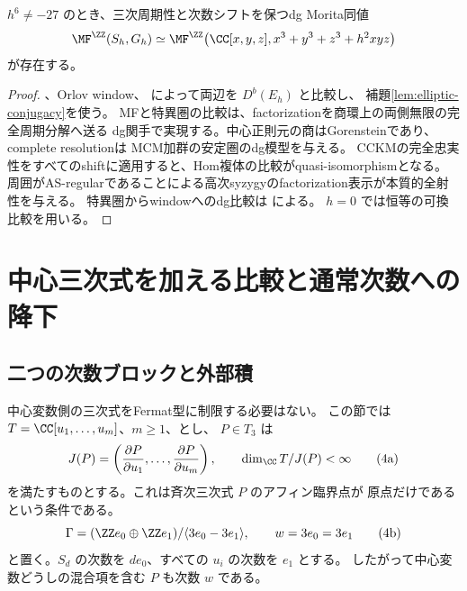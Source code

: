 \begin{corollary}\label{cor:block}
 \(h^6\ne-27\) のとき、三次周期性と次数シフトを保つdg Morita同値
 \[
 \MF^{\ZZ}(S_h,G_h)
 \simeq
 \MF^{\ZZ}\bigl(\CC[x,y,z],x^3+y^3+z^3+h^2xyz\bigr)
 \]
 が存在する。
\end{corollary}
\begin{proof}
 \cite[Theorem 3.6.2]{EG}、Orlov window、
 \cite[Theorem 5.8]{CCKM}によって両辺を \(D^b(E_h)\) と比較し、
 補題\ref{lem:elliptic-conjugacy}を使う。
 MFと特異圏の比較は、factorizationを商環上の両側無限の完全周期分解へ送る
 dg関手で実現する。中心正則元の商はGorensteinであり、complete resolutionは
 MCM加群の安定圏のdg模型を与える。
 CCKMの完全忠実性をすべてのshiftに適用すると、Hom複体の比較がquasi-isomorphismとなる。
 周囲がAS-regularであることによる高次syzygyのfactorization表示が本質的全射性を与える。
 特異圏からwindowへのdg比較は \cite[Section 5, Theorem 5.8]{CT} による。
 \(h=0\) では恒等の可換比較を用いる。
\end{proof}

\section{中心三次式を加える比較と通常次数への降下}\label{sec:TS}

\subsection{二つの次数ブロックと外部積}

中心変数側の三次式をFermat型に制限する必要はない。
この節では \(T=\CC[u_1,\ldots,u_m]\)、\(m\ge1\)、とし、
\(P\in T_3\) は
\[
 J(P)=\left(\frac{\partial P}{\partial u_1},\ldots,
                 \frac{\partial P}{\partial u_m}\right),\qquad
 \dim_\CC T/J(P)<\infty                                      \tag{4a}\label{eq:central-isolated}
\]
を満たすものとする。これは斉次三次式 \(P\) のアフィン臨界点が
原点だけであるという条件である。
\[
 \Gamma=(\ZZ e_0\oplus\ZZ e_1)/\langle3e_0-3e_1\rangle,
 \qquad w=3e_0=3e_1                                       \tag{4b}\label{eq:central-gamma}
\]
と置く。\(S_d\) の次数を \(de_0\)、すべての \(u_i\) の次数を \(e_1\) とする。
したがって中心変数どうしの混合項を含む \(P\) も次数 \(w\) である。

